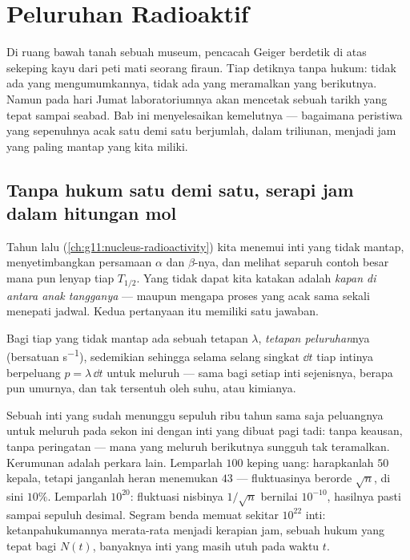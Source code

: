 \chapter{Peluruhan Radioaktif}\label{ch:g12:radioactive-decay}

Di ruang bawah tanah sebuah museum, pencacah Geiger berdetik di atas sekeping kayu
dari peti mati seorang firaun. Tiap detiknya tanpa hukum: tidak ada yang
mengumumkannya, tidak ada yang meramalkan yang berikutnya. Namun pada hari Jumat
laboratoriumnya akan mencetak sebuah tarikh yang tepat sampai seabad. Bab ini
menyelesaikan kemelutnya --- bagaimana peristiwa yang sepenuhnya acak satu demi satu
berjumlah, dalam triliunan, menjadi jam yang paling mantap yang kita miliki.

\section{Tanpa hukum satu demi satu, serapi jam dalam hitungan mol}

Tahun lalu (\cref{ch:g11:nucleus-radioactivity}) kita menemui inti yang tidak
mantap, menyetimbangkan persamaan $\alpha$ dan $\beta$-nya, dan melihat separuh
contoh besar mana pun lenyap tiap  $T_{1/2}$. Yang tidak dapat kita katakan
adalah \emph{kapan di antara anak tangganya} --- maupun mengapa proses yang acak
sama sekali menepati jadwal. Kedua pertanyaan itu memiliki satu jawaban.

\begin{definition}\label{def:g12:radioactive-decay:lambda}
Bagi tiap  yang tidak mantap ada sebuah tetapan $\lambda$, \emph{tetapan
peluruhan}nya (bersatuan \unit{s^{-1}}), sedemikian sehingga selama
selang singkat $\dd t$ tiap intinya berpeluang $p = \lambda\,\dd t$ untuk
meluruh --- sama bagi setiap inti sejenisnya, berapa pun umurnya,
dan tak tersentuh oleh suhu,  atau kimianya.
\end{definition}

\begin{remark}\label{rem:g12:radioactive-decay:crowds}
Sebuah inti yang sudah menunggu sepuluh ribu tahun sama saja peluangnya untuk meluruh
pada sekon ini dengan inti yang dibuat pagi tadi: tanpa keausan, tanpa peringatan ---
mana yang meluruh berikutnya sungguh tak teramalkan. Kerumunan adalah perkara lain. Lemparlah
$100$ keping uang: harapkanlah $50$ kepala, tetapi janganlah heran menemukan $43$ ---
fluktuasinya berorde $\sqrt n$, di sini $10\%$. Lemparlah $10^{20}$: fluktuasi
nisbinya $1/\sqrt n$ bernilai $10^{-10}$, hasilnya pasti sampai
sepuluh desimal. Segram benda memuat sekitar $10^{22}$ inti: ketanpahukumannya
merata-rata menjadi kerapian jam, sebuah hukum yang tepat bagi $N(t)$, banyaknya inti
yang masih utuh pada waktu $t$.
\end{remark}

